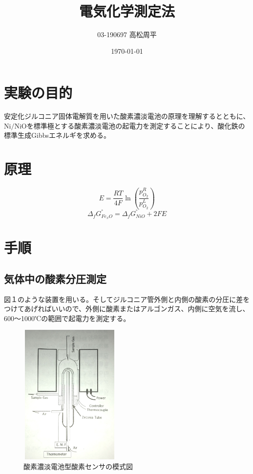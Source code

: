 \documentclass{jsarticle}
\title{電気化学測定法}
\author{03-190697 高松周平}
\date{\today}
\begin{document}
\maketitle
\section{実験の目的}
安定化ジルコニア固体電解質を用いた酸素濃淡電池の原理を理解するとともに、$\mathrm{Ni/NiO}$を標準極とする酸素濃淡電池の起電力を測定することにより、酸化鉄の標準生成Gibbsエネルギを求める。
\section{原理}
$$
E=\frac{RT}{4F}\ln{(\frac{p_{O_2}^R}{p_{O_2}^L})}
$$
$$
\Delta_{f}G_{Fe_xO}^{°}=\Delta_{f}G_{NiO}^{°}+2FE
$$
\section{手順}
\subsection{気体中の酸素分圧測定}
図１のような装置を用いる。そしてジルコニア管外側と内側の酸素の分圧に差をつけてあげればいいので、外側に酸素またはアルゴンガス、内側に空気を流し、600$〜$1000℃の範囲で起電力を測定する。\\
\begin{figure}[htbp]
 \begin{center}
  \includegraphics[width=50mm,height=70mm]{pictures/apparatus.png}
 \end{center}
 \caption{酸素濃淡電池型酸素センサの模式図}
 \label{fig:one}
\end{figure}
\end{document}
